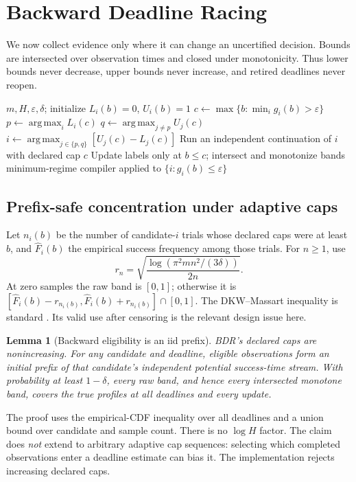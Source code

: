 \documentclass[11pt]{article}
\newtheorem{lemma}[theorem]{Lemma}
\theoremstyle{definition}\newtheorem{definition}[theorem]{Definition}
\newcommand{\eps}{\varepsilon}
\newcommand{\argmax}{\operatorname*{arg\,max}}
\begin{document}
\section{Backward Deadline Racing}\label{sec:racing}
We now collect evidence only where it can change an uncertified decision. Bounds are intersected over observation times and closed under monotonicity. Thus lower bounds never decrease, upper bounds never increase, and retired deadlines never reopen.

\begin{algorithm}[t]
\caption{Backward Deadline Racing (BDR)}\label{alg:bdr}
\begin{algorithmic}[1]
\Require $m,H,\eps,\delta$; initialize $L_i(b)=0$, $U_i(b)=1$
\State $c\gets\max\{b:\min_i g_i(b)>\eps\}$
\State $p\gets\argmax_i L_i(c)$ 
\State $q\gets\argmax_{j\ne p}U_j(c)$ 
\State $i\gets\argmax_{j\in\{p,q\}}[U_j(c)-L_j(c)]$
\State Run an independent continuation of $i$ with declared cap $c$
\State Update labels only at $b\le c$; intersect and monotonize bands
\EndWhile
\State \Return minimum-regime compiler applied to $\{i:g_i(b)\le\eps\}$
\end{algorithmic}
\end{algorithm}

\subsection{Prefix-safe concentration under adaptive caps}
Let $n_i(b)$ be the number of candidate-$i$ trials whose declared caps were at least $b$, and $\widehat F_i(b)$ the empirical success frequency among those trials. For $n\ge1$, use
\begin{equation}\label{eq:radius}
 r_n=\sqrt{\frac{\log(\pi^2mn^2/(3\delta))}{2n}}.
\end{equation}
At zero samples the raw band is $[0,1]$; otherwise it is $[\widehat F_i(b)-r_{n_i(b)},\widehat F_i(b)+r_{n_i(b)}]\cap[0,1]$. The DKW--Massart inequality is standard \citep{massart1990}. Its valid use after censoring is the relevant design issue here.

\begin{lemma}[Backward eligibility is an iid prefix]\label{lem:prefix}
BDR's declared caps are nonincreasing. For any candidate and deadline, eligible observations form an initial prefix of that candidate's independent potential success-time stream. With probability at least $1-\delta$, every raw band, and hence every intersected monotone band, covers the true profiles at all deadlines and every update.
\end{lemma}
The proof uses the empirical-CDF inequality over all deadlines and a union bound over candidate and sample count. There is no $\log H$ factor. The claim does \emph{not} extend to arbitrary adaptive cap sequences: selecting which completed observations enter a deadline estimate can bias it. The implementation rejects increasing declared caps.
\end{document}
